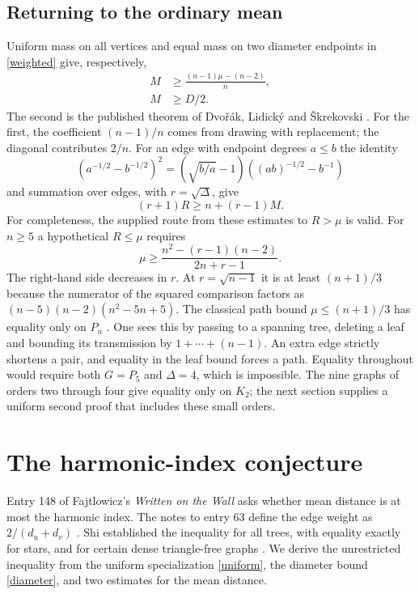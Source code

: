 \documentclass[11pt,a4paper]{article}
\theoremstyle{remark}\newtheorem*{remark}{Remark}
\begin{document}
\subsection{Returning to the ordinary mean}
Uniform mass on all vertices and equal mass on two diameter endpoints in \eqref{weighted} give, respectively,
\begin{align}
 M&\ge\frac{(n-1)\mu-(n-2)}n ,\label{uniform}\\
 M&\ge D/2.\label{diameter}
\end{align}
The second is the published theorem of Dvo\v{r}\'ak, Lidick\'y and \v{S}krekovski \cite{dls}. For the first, the coefficient $(n-1)/n$ comes from drawing with replacement; the diagonal contributes $2/n$. For an edge with endpoint degrees $a\le b$ the identity
\[
 (a^{-1/2}-b^{-1/2})^2=(\sqrt{b/a}-1)((ab)^{-1/2}-b^{-1})
\]
and summation over edges, with $r=\sqrt\Delta$, give
\begin{equation}
 (r+1)R\ge n+(r-1)M.\label{randicbridge}
\end{equation}
For completeness, the supplied route from these estimates to $R>\mu$ is valid. For $n\ge5$ a hypothetical $R\le\mu$ requires
\[
 \mu\ge\frac{n^2-(r-1)(n-2)}{2n+r-1}.
\]
The right-hand side decreases in $r$. At $r=\sqrt{n-1}$ it is at least $(n+1)/3$ because the numerator of the squared comparison factors as $(n-5)(n-2)(n^2-5n+5)$. The classical path bound $\mu\le(n+1)/3$ has equality only on $P_n$ \cite{ejs}. One sees this by passing to a spanning tree, deleting a leaf and bounding its transmission by $1+\cdots+(n-1)$. An extra edge strictly shortens a pair, and equality in the leaf bound forces a path. Equality throughout would require both $G=P_5$ and $\Delta=4$, which is impossible. The nine graphs of orders two through four give equality only on $K_2$; the next section supplies a uniform second proof that includes these small orders.


\section{The harmonic-index conjecture}\label{sec:harmonic}

Entry 148 of Fajtlowicz's \emph{Written on the Wall} asks whether mean distance is at most the harmonic index. The notes to entry 63 define the edge weight as $2/(d_u+d_v)$ \cite{wow}. Shi established the inequality for all trees, with equality exactly for stars, and for certain dense triangle-free graphs \cite{shi}. We derive the unrestricted inequality from the uniform specialization \eqref{uniform}, the diameter bound \eqref{diameter}, and two estimates for the mean distance.
\end{document}
